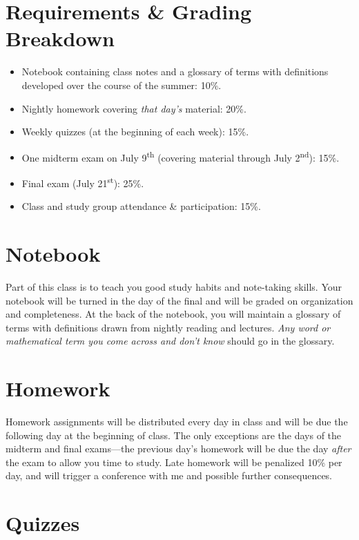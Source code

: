 \documentclass[11pt]{article}
\begin{document}
\section{Requirements \& Grading Breakdown}

\begin{itemize}
\item Notebook containing class notes and a glossary of terms with definitions developed over the course of the summer: 10\%.
\item Nightly homework covering \emph{that day's} material: 20\%.
\item Weekly quizzes (at the beginning of each week): 15\%.
\item One midterm exam on July 9\textsuperscript{th} (covering material through July 2\textsuperscript{nd}): 15\%.
\item Final exam (July 21\textsuperscript{st}): 25\%.
\item Class and study group attendance \& participation: 15\%.
\end{itemize}


\section{Notebook}

Part of this class is to teach you good study habits and note-taking skills. Your notebook will be turned in the day of the final and will be graded on organization and completeness. At the back of the notebook, you will maintain a glossary of terms with definitions drawn from nightly reading and lectures. \emph{Any word or mathematical term you come across and don't know} should go in the glossary.


\section{Homework}

Homework assignments will be distributed every day in class and will be due the following day at the beginning of class. The only exceptions are the days of the midterm and final exams---the previous day's homework will be due the day \emph{after} the exam to allow you time to study. Late homework will be penalized 10\% per day, and will trigger a conference with me and possible further consequences.


\section{Quizzes}
\end{document}
